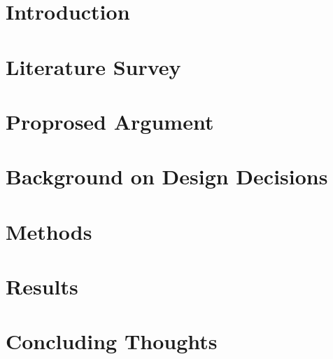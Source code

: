 \documentclass[12pt]{report}
\begin{document}
\normalem       %

\chapter{\normalsize Introduction}


\chapter{\normalsize Literature Survey}


\chapter{\normalsize Proprosed Argument}


\chapter{\normalsize Background on Design Decisions}


\chapter{\normalsize Methods}


\chapter{\normalsize Results}


\chapter{\normalsize Concluding Thoughts}





\end{document}
